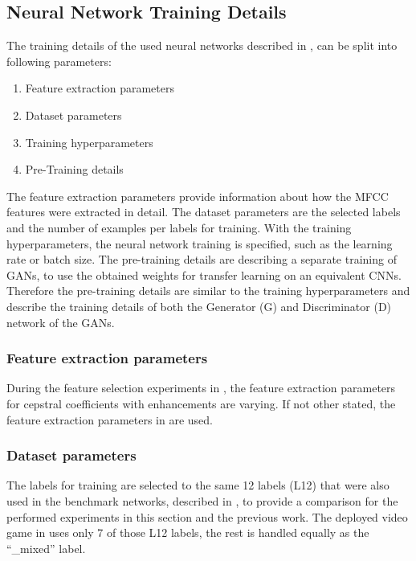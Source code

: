 
\subsection{Neural Network Training Details}\label{sec:exp_details_training}
The training details of the used neural networks described in , can be split into following parameters:
\begin{enumerate}
  \item Feature extraction parameters
  \item Dataset parameters
  \item Training hyperparameters
  \item Pre-Training details
\end{enumerate}
The feature extraction parameters provide information about how the MFCC features were extracted in detail.
The dataset parameters are the selected labels and the number of examples per labels for training.
With the training hyperparameters, the neural network training is specified, such as the learning rate or batch size.
The pre-training details are describing a separate training of GANs, to use the obtained weights for transfer learning on an equivalent CNNs.
Therefore the pre-training details are similar to the training hyperparameters and describe the training details of both the Generator (G) and Discriminator (D) network of the GANs.



\subsubsection{Feature extraction parameters}
During the feature selection experiments in , the feature extraction parameters for cepstral coefficients with enhancements are varying.
If not other stated, the feature extraction parameters in  are used.




\subsubsection{Dataset parameters}
The labels for training are selected to the same 12 labels (L12) that were also used in the benchmark networks, described in , to provide a comparison for the performed experiments in this section and the previous work.
The deployed video game in  uses only 7 of those L12 labels, the rest is handled equally as the \enquote{\_mixed} label.


